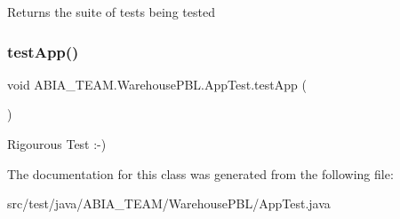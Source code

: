 \begin{DoxyReturn}{Returns}
the suite of tests being tested 
\end{DoxyReturn}
\mbox{\label{class_a_b_i_a___t_e_a_m_1_1_warehouse_p_b_l_1_1_app_test_a90b5823f6dbfe81379aa8a0ee61e91d0}} 
\subsubsection{\texorpdfstring{test\+App()}{testApp()}}
{\footnotesize\ttfamily void A\+B\+I\+A\+\_\+\+T\+E\+A\+M.\+Warehouse\+P\+B\+L.\+App\+Test.\+test\+App (\begin{DoxyParamCaption}{ }\end{DoxyParamCaption})}

Rigourous Test \+:-\/) 

The documentation for this class was generated from the following file\+:\begin{DoxyCompactItemize}
\item 
src/test/java/\+A\+B\+I\+A\+\_\+\+T\+E\+A\+M/\+Warehouse\+P\+B\+L/App\+Test.\+java\end{DoxyCompactItemize}
